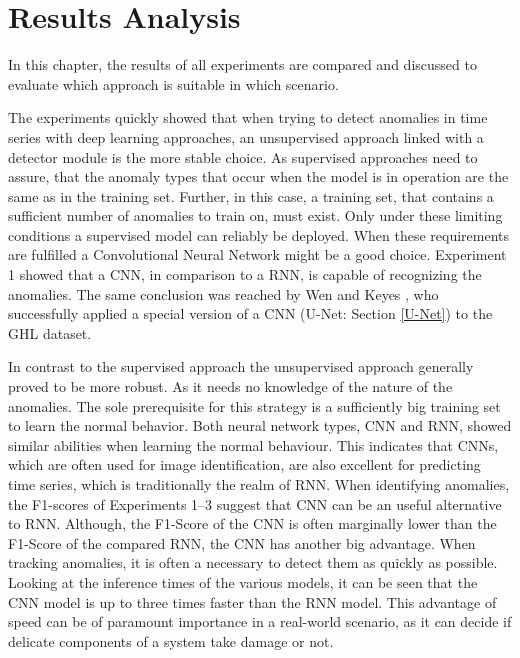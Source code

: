 \chapter{Results Analysis}

In this chapter, the results of all experiments are compared and discussed to evaluate which approach is suitable in which scenario. 

The experiments quickly showed that when trying to detect anomalies in time series with deep learning approaches, an unsupervised approach linked with a detector module is the more stable choice. As supervised approaches need to assure, that the anomaly types that occur when the model is in operation are the same as in the training set. Further, in this case, a training set, that contains a sufficient number of anomalies to train on, must exist. Only under these limiting conditions a supervised model can reliably be deployed. When these requirements are fulfilled a Convolutional Neural Network might be a good choice. 
Experiment 1 showed that a CNN, in comparison to a RNN, is capable of recognizing the anomalies. The same conclusion was reached by Wen and Keyes \parencite*{Wen2019}, who successfully applied a special version of a CNN (U-Net: Section \ref{U-Net}) to the GHL dataset.  

In contrast to the supervised approach the unsupervised approach generally proved to be more robust. As it needs no knowledge of the nature of the anomalies. The sole prerequisite for this strategy is a sufficiently big training set to learn the normal behavior. Both neural network types, CNN and RNN, showed similar abilities when learning the normal behaviour. This indicates that CNNs, which are often used for image identification, are also excellent for predicting time series, which is traditionally the realm of RNN. When identifying anomalies, the F1-scores of Experiments 1–3 suggest that CNN can be an useful alternative to RNN. Although, the F1-Score of the CNN is often marginally lower than the F1-Score of the compared RNN, the CNN has another big advantage. When tracking anomalies, it is often a necessary to detect them as quickly as possible. Looking at the inference times of the various models, it can be seen that the CNN model is up to three times faster than the RNN model. This advantage of speed can be of paramount importance in a real-world scenario, as it can decide if delicate components of a system take damage or not.

